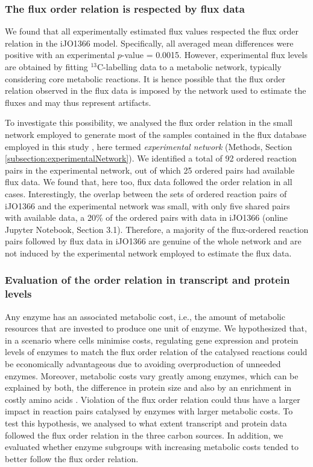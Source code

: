 \documentclass[12pt]{article}
\begin{document}
\subsubsection{The flux order relation is respected by flux data}
We found that all experimentally estimated flux values respected the flux order relation in the iJO1366 model. Specifically, all averaged mean differences were positive with an experimental $p$-value = 0.0015. However, experimental flux levels are obtained by fitting ${}^{13}\mathrm{C}$-labelling data to a metabolic network, typically considering core metabolic reactions. It is hence possible that the flux order relation observed in the flux data is imposed by the network used to estimate the fluxes and may thus represent artifacts.

To investigate this possibility, we analysed the flux order relation in the small network employed to generate most of the samples contained in the flux database employed in this study \cite{Ishii2007}, here termed \emph{experimental network} (Methods, Section \ref{subsection:experimentalNetwork}). We identified a total of 92 ordered reaction pairs in the experimental network, out of which 25 ordered pairs had available flux data. We found that, here too, flux data followed the order relation in all cases. Interestingly, the overlap between the sets of ordered reaction pairs of iJO1366 and the experimental network was small, with only five shared pairs with available data, a 20\% of the ordered pairs with data in iJO1366 (online Jupyter Notebook, Section 3.1). Therefore, a majority of the flux-ordered reaction pairs followed by flux data in iJO1366 are genuine of the whole network and are not induced by the experimental network employed to estimate the flux data.

\subsubsection{Evaluation of the order relation in transcript and protein levels}
Any enzyme has an associated metabolic cost, i.e., the amount of metabolic resources that are invested to produce one unit of enzyme. We hypothesized that, in a scenario where cells minimise costs, regulating gene expression and protein levels of enzymes to match the flux order relation of the catalysed reactions could be economically advantageous due to avoiding overproduction of unneeded enzymes. Moreover, metabolic costs vary greatly among enzymes, which can be explained by both, the difference in protein size and also by an enrichment in costly amino acids \cite{Noor2016}. Violation of the flux order relation could thus have a larger impact in reaction pairs catalysed by enzymes with larger metabolic costs. To test this hypothesis, we analysed to what extent transcript and protein data followed the flux order relation in the three carbon sources. In addition, we evaluated whether enzyme subgroups with increasing metabolic costs tended to better follow the flux order relation.
\end{document}
